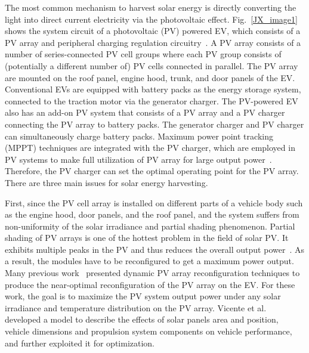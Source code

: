 The most common mechanism to harvest solar energy is directly converting the light into direct current electricity via the photovoltaic effect. Fig.~\ref{JX_image1} shows the system circuit of a photovoltaic (PV) powered EV, which consists of a PV array and peripheral charging regulation circuitry~\cite{JX_68,JX_34}. A PV array consists of a number of series-connected PV cell groups where each PV group consists of (potentially a different number of) PV cells connected in parallel. The PV array are mounted on the roof panel, engine hood, trunk, and door panels of the EV. Conventional EVs are equipped with battery packs as the energy storage system, connected to the traction motor via the generator charger. The PV-powered EV also has an add-on PV system that consists of a PV array and a PV charger connecting the PV array to battery packs. The generator charger and PV charger can simultaneously charge battery packs. Maximum power point tracking (MPPT) techniques are integrated with the PV charger, which are employed in PV systems to make full utilization of PV array for large output power~\cite{JX_5,JX_41,JX_47}. Therefore, the PV charger can set the optimal operating point for the PV array. There are three main issues for solar energy harvesting.

First, since the PV cell array is installed on different parts of a vehicle body such as the engine hood, door panels, and the roof panel, and the system suffers from non-uniformity of the solar irradiance and partial shading phenomenon. Partial shading of PV arrays is one of the hottest problem in the field of solar PV. It exhibits multiple peaks in the PV and thus reduces the overall output power~\cite{JX_57}. As a result, the modules have to be reconfigured to get a maximum power output. Many previous work~\cite{JX_6,JX_34,JX_64,JX_68} presented dynamic PV array reconfiguration techniques to produce the near-optimal reconfiguration of the PV array on the EV. For these work, the goal is to maximize the PV system output power under any solar irradiance and temperature distribution on the PV array. Vicente et al.~\cite{JX_66} developed a model to describe the effects of solar panels area and position, vehicle dimensions and propulsion system components on vehicle performance, and further exploited it for optimization.

